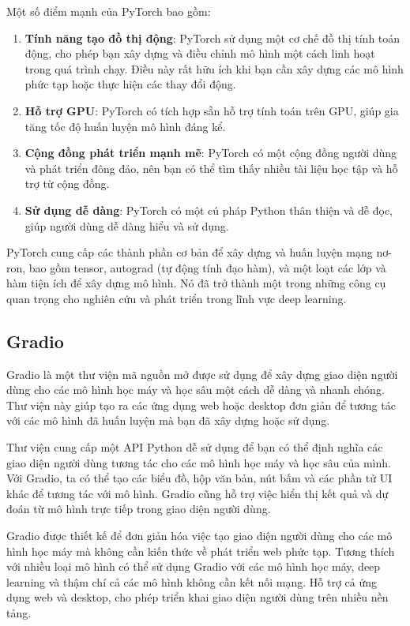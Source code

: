 Một số điểm mạnh của PyTorch bao gồm:
\begin{enumerate}
    \item \textbf{Tính năng tạo đồ thị động}: PyTorch sử dụng một cơ chế đồ thị tính toán động, cho phép bạn xây dựng và điều chỉnh mô hình một cách linh hoạt trong quá trình chạy. Điều này rất hữu ích khi bạn cần xây dựng các mô hình phức tạp hoặc thực hiện các thay đổi động.
    \item \textbf{Hỗ trợ GPU}: PyTorch có tích hợp sẵn hỗ trợ tính toán trên GPU, giúp gia tăng tốc độ huấn luyện mô hình đáng kể.
    \item \textbf{Cộng đồng phát triển mạnh mẽ}: PyTorch có một cộng đồng người dùng và phát triển đông đảo, nên bạn có thể tìm thấy nhiều tài liệu học tập và hỗ trợ từ cộng đồng.
    \item \textbf{Sử dụng dễ dàng}: PyTorch có một cú pháp Python thân thiện và dễ đọc, giúp người dùng dễ dàng hiểu và sử dụng.
\end{enumerate}
PyTorch cung cấp các thành phần cơ bản để xây dựng và huấn luyện mạng nơ-ron, bao gồm tensor, autograd (tự động tính đạo hàm), và một loạt các lớp và hàm tiện ích để xây dựng mô hình. Nó đã trở thành một trong những công cụ quan trọng cho nghiên cứu và phát triển trong lĩnh vực deep learning.

\subsection{Gradio}
Gradio là một thư viện mã nguồn mở được sử dụng để xây dựng giao diện người dùng cho các mô hình học máy và học sâu một cách dễ dàng và nhanh chóng. Thư viện này giúp tạo ra các ứng dụng web hoặc desktop đơn giản để tương tác với các mô hình đã huấn luyện mà bạn đã xây dựng hoặc sử dụng.

Thư viện cung cấp một API Python dễ sử dụng để bạn có thể định nghĩa các giao diện người dùng tương tác cho các mô hình học máy và học sâu của mình. Với Gradio, ta có thể tạo các biểu đồ, hộp văn bản, nút bấm và các phần tử UI khác để tương tác với mô hình. Gradio cũng hỗ trợ việc hiển thị kết quả và dự đoán từ mô hình trực tiếp trong giao diện người dùng.

Gradio được thiết kế để đơn giản hóa việc tạo giao diện người dùng cho các mô hình học máy mà không cần kiến thức về phát triển web phức tạp. Tương thích với nhiều loại mô hình có thể sử dụng Gradio với các mô hình học máy, deep learning và thậm chí cả các mô hình không cần kết nối mạng. Hỗ trợ cả ứng dụng web và desktop, cho phép triển khai giao diện người dùng trên nhiều nền tảng.

